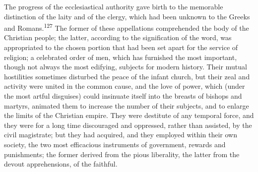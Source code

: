 



The progress of the ecclesiastical authority gave birth to the
memorable distinction of the laity and of the clergy, which had
been unknown to the Greeks and Romans.\textsuperscript{127} The former of these
appellations comprehended the body of the Christian people; the
latter, according to the signification of the word, was
appropriated to the chosen portion that had been set apart for
the service of religion; a celebrated order of men, which has
furnished the most important, though not always the most
edifying, subjects for modern history. Their mutual hostilities
sometimes disturbed the peace of the infant church, but their
zeal and activity were united in the common cause, and the love
of power, which (under the most artful disguises) could insinuate
itself into the breasts of bishops and martyrs, animated them to
increase the number of their subjects, and to enlarge the limits
of the Christian empire. They were destitute of any temporal
force, and they were for a long time discouraged and oppressed,
rather than assisted, by the civil magistrate; but they had
acquired, and they employed within their own society, the two
most efficacious instruments of government, rewards and
punishments; the former derived from the pious liberality, the
latter from the devout apprehensions, of the faithful.


